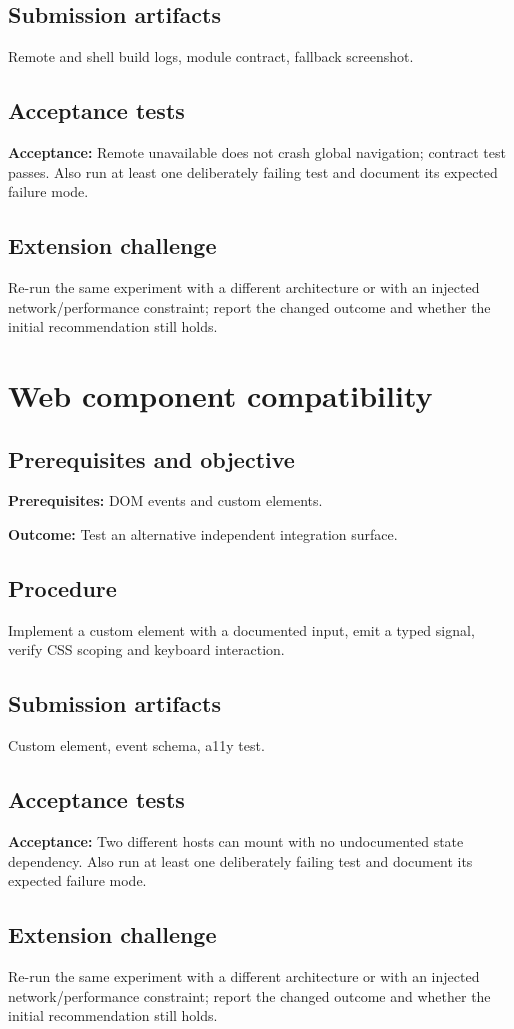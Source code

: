 \documentclass[11pt,letterpaper,oneside]{report}
\newcommand{\criterion}[1]{\textbf{Acceptance:} #1}
\begin{document}
\section{Submission artifacts}
Remote and shell build logs, module contract, fallback screenshot.
\section{Acceptance tests}
\criterion{Remote unavailable does not crash global navigation; contract test passes.} Also run at least one deliberately failing test and document its expected failure mode.
\section{Extension challenge}
Re-run the same experiment with a different architecture or with an injected network/performance constraint; report the changed outcome and whether the initial recommendation still holds.

\chapter{Web component compatibility}
\section{Prerequisites and objective}
\textbf{Prerequisites:} DOM events and custom elements.\par
\textbf{Outcome:} Test an alternative independent integration surface.
\section{Procedure}
Implement a custom element with a documented input, emit a typed signal, verify CSS scoping and keyboard interaction.
\section{Submission artifacts}
Custom element, event schema, a11y test.
\section{Acceptance tests}
\criterion{Two different hosts can mount with no undocumented state dependency.} Also run at least one deliberately failing test and document its expected failure mode.
\section{Extension challenge}
Re-run the same experiment with a different architecture or with an injected network/performance constraint; report the changed outcome and whether the initial recommendation still holds.
\end{document}
